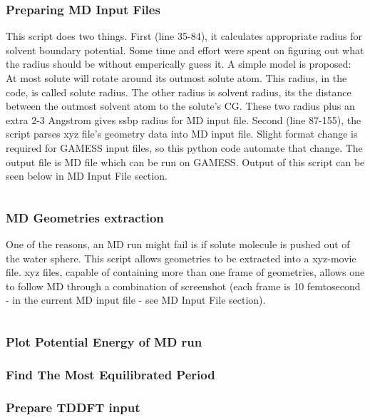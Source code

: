 \documentclass[
journal=jacsat, %
manuscript=article]{achemso}
\begin{document}
		\subsubsection{Preparing MD Input Files}
			This script does two things. First (line 35-84), it calculates appropriate radius for solvent boundary potential. Some time and effort were spent on figuring out what the radius should be without emperically guess it. A simple model is proposed: At most solute will rotate around its outmost solute atom. This radius, in the code, is called solute radius. The other radius is solvent radius, its the distance between the outmost solvent atom to the solute's CG. These two radius plus an extra 2-3 Angstrom gives ssbp radius for MD input file. Second (line 87-155), the script parses xyz file's geometry data into MD input file. Slight format change is required for GAMESS input files, so this python code automate that change. The output file is MD file which can be run on GAMESS. Output of this script can be seen below in MD Input File section.
			\vfill
			\inputminted[linenos, breaklines, baselinestretch=1, fontsize=\small]{python}{../pythonScripts/prepareMD2.py}
		
		\subsubsection{MD Geometries extraction}
			One of the reasons, an MD run might fail is if solute molecule is pushed out of the water sphere. This script allows geometries to be extracted into a xyz-movie file. xyz files, capable of containing more than one frame of geometries, allows one to follow MD through a combination of screenshot (each frame is 10 femtosecond - in the current MD input file - see MD Input File section). 
			\inputminted[linenos, breaklines, baselinestretch=1, fontsize=\small]{python}{../pythonScripts/3dExtract4.py}
			
		\subsubsection{Plot Potential Energy of MD run}
			
		
		\subsubsection{Find The Most Equilibrated Period}
		
		
		\subsubsection{Prepare TDDFT input}
		
\end{document}
